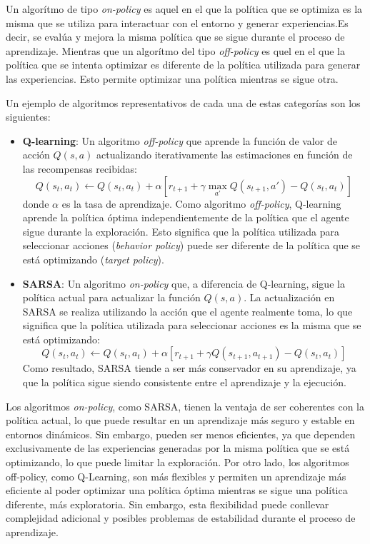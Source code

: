 \documentclass[a4paper,12pt]{report}
\begin{document}
Un algorítmo de tipo \textit{on-policy} es aquel en el que la política que se optimiza es la misma que 
se utiliza para interactuar con el entorno y generar experiencias.Es decir, se evalúa y mejora la misma
política que se sigue durante el proceso de aprendizaje. Mientras que un algorítmo del tipo \textit{off-policy}
es quel en el que la política que se intenta optimizar es diferente de la política utilizada para generar
las experiencias. Esto permite optimizar una política mientras se sigue otra.

Un ejemplo de algoritmos representativos de cada una de estas categorías son los siguientes:


\begin{itemize}
    \item \textbf{Q-learning}: Un algoritmo \textit{off-policy} que aprende la función de valor de 
    acción \(Q(s, a)\) actualizando iterativamente las estimaciones en función de las recompensas recibidas:
    \[
    Q(s_t, a_t) \leftarrow Q(s_t, a_t) + \alpha \left[r_{t+1} + \gamma \max_{a'} Q(s_{t+1}, a') - Q(s_t, a_t)\right]
    \]
    donde \(\alpha\) es la tasa de aprendizaje. Como algoritmo \textit{off-policy}, Q-learning aprende la 
    política óptima independientemente de la política que el agente sigue durante la exploración. 
    Esto significa que la política utilizada para seleccionar acciones (\textit{behavior policy}) 
    puede ser diferente de la política que se está optimizando (\textit{target policy}).

    \item \textbf{SARSA}: Un algoritmo \textit{on-policy} que, a diferencia de Q-learning, sigue la 
    política actual para actualizar la función \(Q(s, a)\). La actualización en SARSA se realiza 
    utilizando la acción que el agente realmente toma, lo que significa que la política utilizada 
    para seleccionar acciones es la misma que se está optimizando:
    \[
    Q(s_t, a_t) \leftarrow Q(s_t, a_t) + \alpha \left[r_{t+1} + \gamma Q(s_{t+1}, a_{t+1}) - Q(s_t, a_t)\right]
    \]
    Como resultado, SARSA tiende a ser más conservador en su aprendizaje, ya que la política sigue 
    siendo consistente entre el aprendizaje y la ejecución.

\end{itemize}

Los algoritmos \textit{on-policy}, como SARSA, tienen la ventaja de ser coherentes con la política 
actual, lo que puede resultar en un aprendizaje más seguro y estable en entornos dinámicos. Sin embargo, 
pueden ser menos eficientes, ya que dependen exclusivamente de las experiencias generadas por la misma 
política que se está optimizando, lo que puede limitar la exploración. Por otro lado, los algoritmos 
off-policy, como Q-Learning, son más flexibles y permiten un aprendizaje más eficiente al poder optimizar 
una política óptima mientras se sigue una política diferente, más exploratoria. Sin embargo, esta 
flexibilidad puede conllevar complejidad adicional y posibles problemas de estabilidad durante el 
proceso de aprendizaje.
\end{document}
